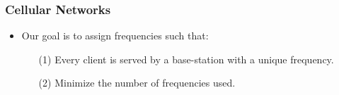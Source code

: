 \documentclass[xcolor=dvipsnames,aspectratio=1610]{beamer}
\begin{document}
  \begin{frame}
    \frametitle{Cellular Networks}



    \pause
    \pause

    \begin{itemize}
      \item Our goal is to assign frequencies such that:
      \pause
      \begin{itemize}
        \item[(1)] Every client is served by a base-station with a unique frequency.
        \pause
        \item[(2)] Minimize the number of frequencies used.
      \end{itemize}
    \end{itemize}

  \end{frame}
\end{document}
